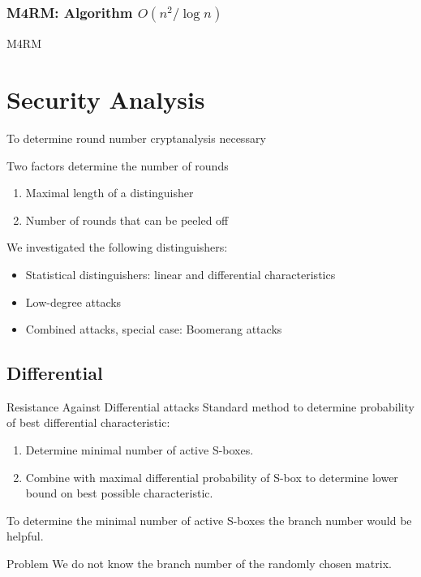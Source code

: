 \documentclass[10pt,compress]{beamer}
\begin{document}
\begin{frame}[fragile]
\frametitle{M4RM: Algorithm $O(n^2/\log n)$}

\begin{algorithm}[H]
\caption{\textsc{M4RM}}
\label{alg:m4rm}
\end{algorithm}

\end{frame}


\section{Security Analysis}

\begin{frame}{To determine round number cryptanalysis necessary}
\begin{alertblock}{Two factors determine the number of rounds}
  \begin{enumerate}
    \item Maximal length of a distinguisher
    \item Number of rounds that can be peeled off
  \end{enumerate}
\end{alertblock}
We investigated the following distinguishers:
\begin{itemize}
  \item Statistical distinguishers: linear and differential characteristics
  \item Low-degree attacks
  \item Combined attacks, special case: Boomerang attacks
\end{itemize}
\end{frame}


\subsection{Differential}

\begin{frame}{Resistance Against Differential attacks}
Standard method to determine probability of best differential characteristic:
\begin{enumerate}
  \item Determine minimal number of active S-boxes.
  \item Combine with maximal differential probability of S-box to determine
        lower bound on best possible characteristic.
\end{enumerate}
To determine the minimal number of active S-boxes the branch number would be helpful.
\begin{alertblock}{Problem}
We do not know the branch number of the randomly chosen matrix.
\end{alertblock}
\end{frame}
\end{document}
